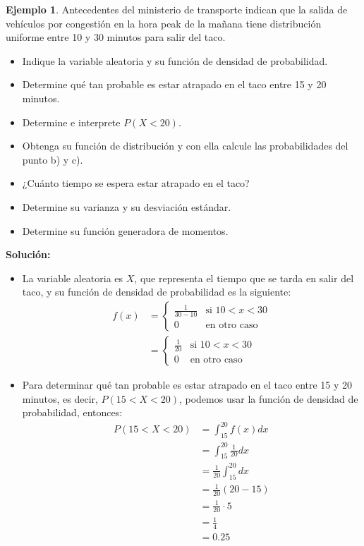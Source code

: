 \documentclass{article}
\theoremstyle{definition}
\newtheorem{example}[definition]{Ejemplo}
\theoremstyle{plain}
\theoremstyle{remark}
\begin{document}
\begin{example}
Antecedentes del ministerio de transporte indican que la salida de vehículos por congestión en la hora peak de la mañana tiene distribución uniforme entre 10 y 30 minutos para salir del taco.

\begin{itemize}
\item Indique la variable aleatoria y su función de densidad de probabilidad.
\item Determine qué tan probable es estar atrapado en el taco entre 15 y 20 minutos.
\item Determine e interprete $P(X < 20)$.
\item Obtenga su función de distribución y con ella calcule las probabilidades del punto b) y c).
\item ¿Cuánto tiempo se espera estar atrapado en el taco?
\item Determine su varianza y su desviación estándar.
\item Determine su función generadora de momentos.
\end{itemize}

\textbf{Solución:}

\begin{itemize}
\item La variable aleatoria es $X$, que representa el tiempo que se tarda en salir del taco, y su función de densidad de probabilidad es la siguiente:
\begin{align*}
f(x) &= \begin{cases}
\frac{1}{30 - 10} & \text{si } 10 < x < 30 \\
0 & \text{en otro caso}
\end{cases} \\
&= \begin{cases}
\frac{1}{20} & \text{si } 10 < x < 30 \\
0 & \text{en otro caso}
\end{cases}
\end{align*}


\item Para determinar qué tan probable es estar atrapado en el taco entre 15 y 20 minutos, es decir, $P(15 < X < 20)$, podemos usar la función de densidad de probabilidad, entonces:
\begin{align*}
P(15 < X < 20) &= \int_{15}^{20} f(x) dx \\
&= \int_{15}^{20} \frac{1}{20} dx \\
&= \frac{1}{20} \int_{15}^{20} dx \\
&= \frac{1}{20} (20 - 15) \\
&= \frac{1}{20} \cdot 5 \\
&= \frac{1}{4} \\
&= 0.25
\end{align*}


\end{itemize}
\end{example}
\end{document}

